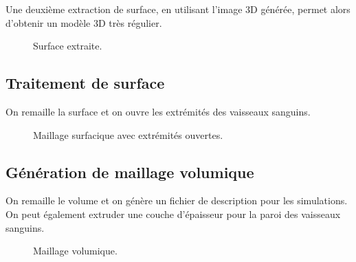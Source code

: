 Une deuxième extraction de surface, en utilisant l'image 3D générée, permet alors d'obtenir un modèle 3D très régulier.

\begin{figure}[H]
\begin{center}
\caption{Surface extraite.%
}
\end{center}
\label{fig:sfi2}
\end{figure}

\subsection{Traitement de surface}

On remaille la surface et on ouvre les extrémités des vaisseaux sanguins.

\begin{figure}[H]
\begin{center}
\caption{Maillage surfacique avec extrémités ouvertes.%
}
\end{center}
\label{fig:vm}
\end{figure}

\subsection{Génération de maillage volumique}
\label{arch:vm}

On remaille le volume et on génère un fichier de description pour les simulations. On peut également extruder une couche d'épaisseur pour la paroi des vaisseaux sanguins.

\begin{figure}[H]
\begin{center}
\caption{Maillage volumique.%
}
\end{center}
\label{fig:vm}
\end{figure}

\newcommand{\figpart}{.5}
\newcommand{\hpart}{1.}

